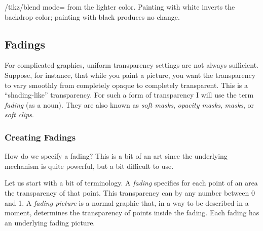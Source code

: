 \begin{key}{/tikz/blend mode=}
{        from the lighter color. Painting with white inverts the backdrop color;
        painting with black produces no change.}
\end{key}


\subsection{Fadings}

For complicated graphics, uniform transparency settings are not always
sufficient. Suppose, for instance, that while you paint a picture, you want the
transparency to vary smoothly from completely opaque to completely transparent.
This is a ``shading-like'' transparency. For such a form of transparency I will
use the term \emph{fading} (as a noun). They are also known as \emph{soft
masks}, \emph{opacity masks}, \emph{masks}, or \emph{soft clips}.


\subsubsection{Creating Fadings}

How do we specify a fading? This is a bit of an art since the underlying
mechanism is quite powerful, but a bit difficult to use.

Let us start with a bit of terminology. A \emph{fading} specifies for each
point of an area the transparency of that point. This transparency can by any
number between 0 and 1. A \emph{fading picture} is a normal graphic that, in a
way to be described in a moment, determines the transparency of points inside
the fading. Each fading has an underlying fading picture.

